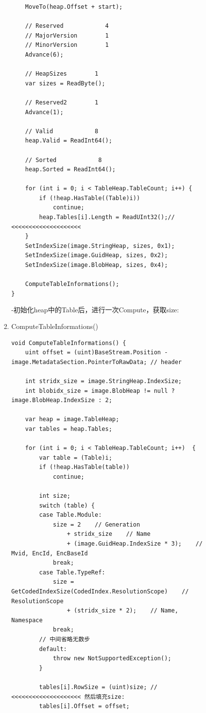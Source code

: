 \documentclass[9pt, b5paper]{article}
\begin{document}
\begin{enumerate}
\begin{enumerate}
\begin{enumerate}
\begin{enumerate}
\begin{verbatim}
    MoveTo(heap.Offset + start);

    // Reserved            4
    // MajorVersion        1
    // MinorVersion        1
    Advance(6);

    // HeapSizes        1
    var sizes = ReadByte();

    // Reserved2        1
    Advance(1);

    // Valid            8
    heap.Valid = ReadInt64();

    // Sorted            8
    heap.Sorted = ReadInt64();

    for (int i = 0; i < TableHeap.TableCount; i++) {
        if (!heap.HasTable((Table)i))
            continue;
        heap.Tables[i].Length = ReadUInt32();// <<<<<<<<<<<<<<<<<<<< 
    } 
    SetIndexSize(image.StringHeap, sizes, 0x1);
    SetIndexSize(image.GuidHeap, sizes, 0x2);
    SetIndexSize(image.BlobHeap, sizes, 0x4);

    ComputeTableInformations();
}
\end{verbatim}
-初始化heap中的Table后，进行一次Compute，获取size:
\item ComputeTableInformations()
\label{sec-10-1-3-1-3-4-2}
\begin{verbatim}
void ComputeTableInformations() {
    uint offset = (uint)BaseStream.Position - image.MetadataSection.PointerToRawData; // header

    int stridx_size = image.StringHeap.IndexSize;
    int blobidx_size = image.BlobHeap != null ? image.BlobHeap.IndexSize : 2;

    var heap = image.TableHeap;
    var tables = heap.Tables;

    for (int i = 0; i < TableHeap.TableCount; i++)  {
        var table = (Table)i;
        if (!heap.HasTable(table))
            continue;

        int size;
        switch (table) {
        case Table.Module:
            size = 2    // Generation
                + stridx_size    // Name
                + (image.GuidHeap.IndexSize * 3);    // Mvid, EncId, EncBaseId
            break;
        case Table.TypeRef:
            size = GetCodedIndexSize(CodedIndex.ResolutionScope)    // ResolutionScope
                + (stridx_size * 2);    // Name, Namespace
            break;
        // 中间省略无数步
        default:
            throw new NotSupportedException();
        }

        tables[i].RowSize = (uint)size; // <<<<<<<<<<<<<<<<<<<< 然后填充size:
        tables[i].Offset = offset;


\end{verbatim}
\end{enumerate}
\end{enumerate}
\end{enumerate}
\end{enumerate}
\end{document}
